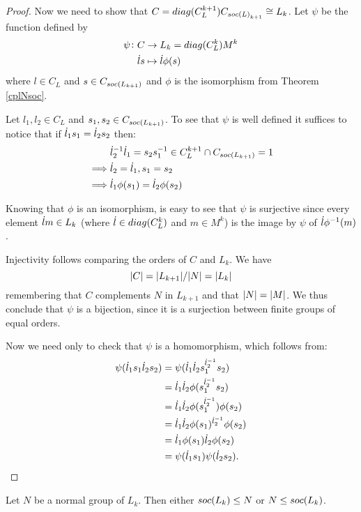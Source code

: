 \begin{proof}
    Now we need to show that $C = diag({C_L^{k+1}})C_{soc {(L)}_{k+1}} \cong L_k$. Let $\psi$ be the function defined by
    \begin{align*}
        \psi \colon C & \rightarrow L_k=diag({C_L^k})M^k \\
                    \dot{l} s &\mapsto \dot{l} \phi(s)
    \end{align*}
    where $l \in C_L$ and $s \in C_{soc {(L_{k+1})}}$ and $\phi$ is the isomorphism from Theorem \ref{cplNsoc}.

    Let $l_1, l_2 \in C_L$ and $s_1, s_2 \in C_{soc {(L_{k+1})}}$.
    To see that $\psi$ is well defined it suffices to notice that if $\dot{l}_1s_1 = \dot{l}_2s_2$ then:
    \begin{align*}
        &\dot{l}_2^{-1}\dot{l}_1 = s_2s_1^{-1} \in C_L^{k+1} \cap C_{soc {(L_{k+1})}} = 1 \\
        \implies & \dot{l}_2 = \dot{l}_1, s_1 = s_2 \\
        \implies & \dot{l}_1\phi(s_1) = \dot{l}_2\phi(s_2)
    \end{align*}

    Knowing that $\phi$ is an isomorphism, is easy to see that $\psi$ is surjective since every element $\dot{l} m \in L_k$ (where $\dot{l} \in diag({C_L^k})$ and $m \in M^k$) is the image by $\psi$ of $\dot{l}\phi^{-1}(m)$.

    Injectivity follows comparing the orders of $C$ and $L_k$. We have
    $$
    | C | = | L_{k+1} | / | N | = | L_k |
    $$
    remembering that $C$ complements $N$ in $L_{k+1}$ and that $| N | = | M |$.
    We thus conclude that $\psi$ is a bijection, since it is a surjection between finite groups of equal orders.

    Now we need only to check that $\psi$ is a homomorphism, which follows from:
    \begin{align*}
        \psi(\dot{l}_1s_1\dot{l}_2s_2) &= 
    \psi(\dot{l}_1\dot{l}_2s_1^{\dot{l}_2^{-1}}s_2)\\
    &= \dot{l}_1\dot{l}_2\phi(s_1^{\dot{l}_2^{-1}}s_2)\\
    &=\dot{l}_1\dot{l}_2\phi(s_1^{\dot{l}_2^{-1}})\phi(s_2)\\
    &=\dot{l}_1\dot{l}_2\phi(s_1)^{\dot{l}_2^{-1}}\phi(s_2)\\
    &=\dot{l}_1\phi(s_1)\dot{l}_2\phi(s_2)\\
    &= \psi(\dot{l}_1s_1)\psi(\dot{l}_2s_2).
    \end{align*}
\end{proof}

\begin{theorem}
    \label{th:nsubsoc}
    Let $N$ be a normal group of $L_k$. Then either $soc {(L_k)} \le N$ or $N \le soc {(L_k)}$.
\end{theorem}

